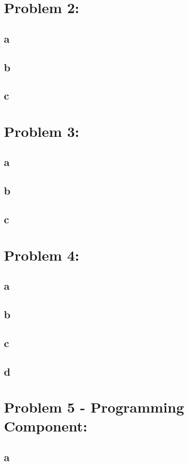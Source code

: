 \documentclass[11pt, oneside]{article}   	%
\begin{document}
\begin{flushleft}
\section*{Problem 2:}
\subsection*{a}
\subsection*{b}
\subsection*{c}
\section*{Problem 3:}
\subsection*{a}
\subsection*{b}
\subsection*{c}
\section*{Problem 4:}
\subsection*{a}
\subsection*{b}
\subsection*{c}
\subsection*{d}
\section*{Problem 5 - Programming Component:}
\subsection*{a}

\end{flushleft}
\end{document}
